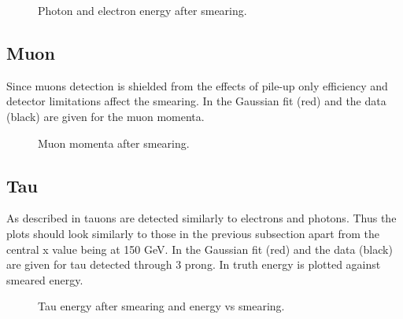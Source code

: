 
 \begin{figure}[H] %
    \hfill
{}
    \hfill
    \hfill
{}
    \caption{Photon and electron energy after smearing.}
    \label{fig:elph}
\end{figure}
\newpage
\subsection{Muon}
Since muons detection is shielded from the effects of pile-up only efficiency and detector limitations affect the smearing. In  the Gaussian fit (red) and the data (black) are given for the muon momenta.
 \begin{figure}[H] %
    \hfill
    \caption{Muon momenta after smearing.}
    \label{fig:muon}
  \end{figure}
\subsection{Tau}
As described in  tauons are detected similarly to electrons and photons. Thus the plots should look similarly to those in the previous subsection apart from the central x value being at 150 GeV. In  the Gaussian fit (red) and the data (black) are given for tau detected through 3 prong. In  truth energy is plotted against smeared energy. 
 \begin{figure}[H] %
    \hfill
    \caption{Tau energy after smearing and energy vs smearing.}
    \label{fig:tau}
  \end{figure}
  \newpage
